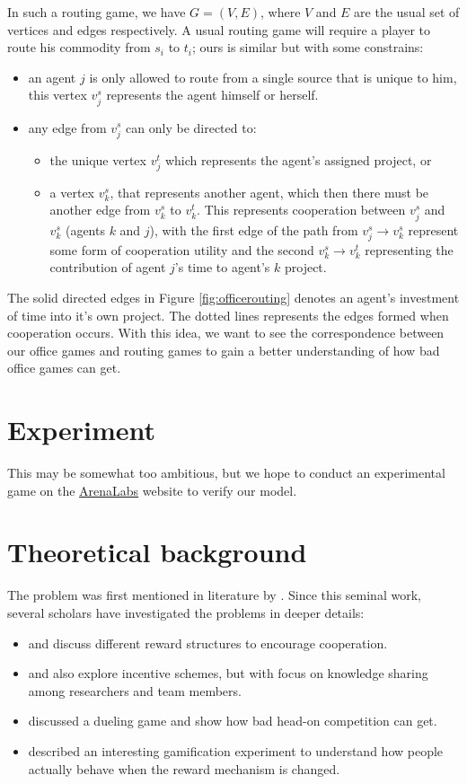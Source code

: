 \documentclass[11pt, a4paper]{article}
\begin{document}
	In such a routing game, we have $G=(V,E)$, where $V$ and $E$ are the usual set of vertices and edges respectively. A usual routing game will require a player to route his commodity from $s_i$ to $t_i$; ours is similar but with some constrains:
	\begin{itemize}
	\item an agent $j$ is only allowed to route from a single source that is unique to him, this vertex $v^s_j$ represents the agent himself or herself.
	\item any edge from $v^s_j$ can only be directed to:
	\begin{itemize}
	\item	 the unique vertex $v^t_j$ which represents the agent's assigned project, or
	\item a vertex $v^s_k$, that represents another agent, which then there must be another edge from $v^s_k$ to $v^t_k$. This represents cooperation between $v^s_j$ and $v^s_k$ (agents $k$ and $j$), with the first edge of the path from $v^s_j\to v^s_k$ represent some form of cooperation utility and the second $v^s_k\to v^t_k$ representing the contribution of agent $j$'s time to agent's $k$ project.
	\end{itemize}
	\end{itemize}
	The solid directed edges in Figure \ref{fig:officerouting} denotes an agent's investment of time into it's own project. The dotted lines represents the edges formed when cooperation occurs. With this idea, we want to see the correspondence between our office games and routing games to gain a better understanding of how bad office games can get.
	\section{Experiment} 
	This may be somewhat too ambitious, but we hope to conduct an experimental game on the \href{http://arenalabs.co/}{ArenaLabs} website to verify our model.
	
	\section{Theoretical background}
	The problem was first mentioned in literature by \cite{Drago1991}. Since this seminal work, several scholars have investigated the problems in deeper details:
	\begin{itemize}
		\item \cite{Drago1998} and \cite{Kistruck2016} discuss different reward structures to encourage cooperation.
		\item \cite{Banerjee2014} and \cite{Chakravarti2015} also explore incentive schemes, but with focus on knowledge sharing among researchers and team members.
		\item \cite{Immorlica2011} discussed a dueling game and show how bad head-on competition can get.
		\item \cite{Landers2015} described an interesting gamification experiment to understand how people actually behave when the reward mechanism is changed.		
	\end{itemize}
	
\end{document}
